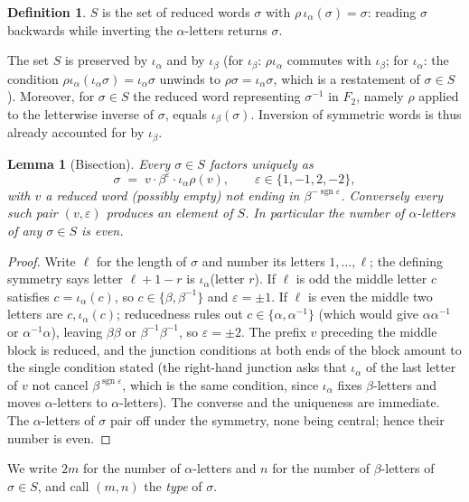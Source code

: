 \documentclass[11pt]{article}
\newtheorem{lemma}[theorem]{Lemma}
\theoremstyle{definition}
\newtheorem{definition}[theorem]{Definition}
\theoremstyle{remark}
\newcommand{\ia}{\iota_\alpha}
\newcommand{\ib}{\iota_\beta}
\begin{document}
\begin{definition}
$S$ is the set of reduced words $\sigma$ with $\rho\,\ia(\sigma)=\sigma$: reading $\sigma$ backwards while inverting the $\alpha$-letters returns $\sigma$.
\end{definition}

The set $S$ is preserved by $\ia$ and by $\ib$ (for $\ib$: $\rho\ia$ commutes with $\ib$; for $\ia$: the condition $\rho\ia(\ia\sigma)=\ia\sigma$ unwinds to $\rho\sigma=\ia\sigma$, which is a restatement of $\sigma\in S$). Moreover, for $\sigma\in S$ the reduced word representing $\sigma^{-1}$ in $F_2$, namely $\rho$ applied to the letterwise inverse of $\sigma$, equals $\ib(\sigma)$. Inversion of symmetric words is thus already accounted for by $\ib$.

\begin{lemma}[Bisection]\label{lem:bisect}
Every $\sigma\in S$ factors uniquely as
\[
\sigma \;=\; v\cdot\beta^{\varepsilon}\cdot \ia\rho(v),
\qquad \varepsilon\in\{1,-1,2,-2\},
\]
with $v$ a reduced word (possibly empty) not ending in $\beta^{-\operatorname{sgn}\varepsilon}$. Conversely every such pair $(v,\varepsilon)$ produces an element of $S$. In particular the number of $\alpha$-letters of any $\sigma\in S$ is even.
\end{lemma}

\begin{proof}
Write $\ell$ for the length of $\sigma$ and number its letters $1,\dots,\ell$; the defining symmetry says letter $\ell+1-r$ is $\ia$(letter $r$). If $\ell$ is odd the middle letter $c$ satisfies $c=\ia(c)$, so $c\in\{\beta,\beta^{-1}\}$ and $\varepsilon=\pm1$. If $\ell$ is even the middle two letters are $c,\ia(c)$; reducedness rules out $c\in\{\alpha,\alpha^{-1}\}$ (which would give $\alpha\alpha^{-1}$ or $\alpha^{-1}\alpha$), leaving $\beta\beta$ or $\beta^{-1}\beta^{-1}$, so $\varepsilon=\pm2$. The prefix $v$ preceding the middle block is reduced, and the junction conditions at both ends of the block amount to the single condition stated (the right-hand junction asks that $\ia$ of the last letter of $v$ not cancel $\beta^{\operatorname{sgn}\varepsilon}$, which is the same condition, since $\ia$ fixes $\beta$-letters and moves $\alpha$-letters to $\alpha$-letters). The converse and the uniqueness are immediate. The $\alpha$-letters of $\sigma$ pair off under the symmetry, none being central; hence their number is even.
\end{proof}

We write $2m$ for the number of $\alpha$-letters and $n$ for the number of $\beta$-letters of $\sigma\in S$, and call $(m,n)$ the \emph{type} of $\sigma$.
\end{document}
